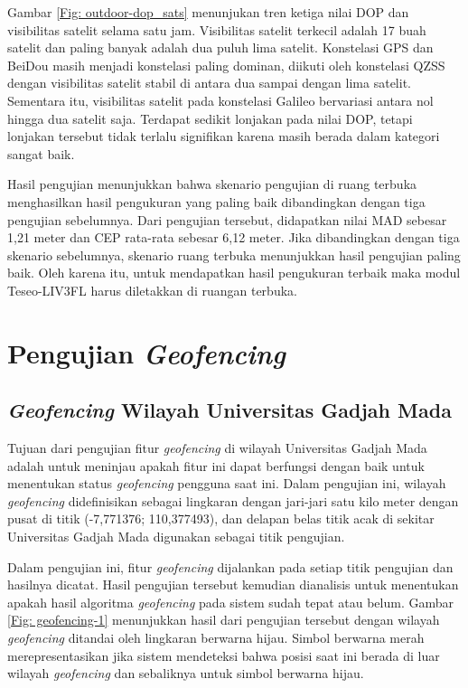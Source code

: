 Gambar \ref{Fig: outdoor-dop_sats} menunjukan tren ketiga nilai DOP dan visibilitas satelit selama satu jam. Visibilitas satelit terkecil adalah 17 buah satelit dan paling banyak adalah dua puluh lima satelit. Konstelasi GPS dan BeiDou masih menjadi konstelasi paling dominan, diikuti oleh konstelasi QZSS dengan visibilitas satelit stabil di antara dua sampai dengan lima satelit. Sementara itu, visibilitas satelit pada konstelasi Galileo bervariasi antara nol hingga dua satelit saja. Terdapat sedikit lonjakan pada nilai DOP, tetapi lonjakan tersebut tidak terlalu signifikan karena masih berada dalam kategori sangat baik.

Hasil pengujian menunjukkan bahwa skenario pengujian di ruang terbuka menghasilkan hasil pengukuran yang paling baik dibandingkan dengan tiga pengujian sebelumnya. Dari pengujian tersebut, didapatkan nilai MAD sebesar 1,21 meter dan CEP rata-rata sebesar 6,12 meter. Jika dibandingkan dengan tiga skenario sebelumnya, skenario ruang terbuka menunjukkan hasil pengujian paling baik. Oleh karena itu, untuk mendapatkan hasil pengukuran terbaik maka modul Teseo\hyp{}LIV3FL harus diletakkan di ruangan terbuka.

\section{Pengujian \textit{Geofencing}}
\subsection{\textit{Geofencing} Wilayah Universitas Gadjah Mada}
Tujuan dari pengujian fitur \textit{geofencing} di wilayah Universitas Gadjah Mada adalah untuk meninjau apakah fitur ini dapat berfungsi dengan baik untuk menentukan status \textit{geofencing} pengguna saat ini. Dalam pengujian ini, wilayah \textit{geofencing} didefinisikan sebagai lingkaran dengan jari-jari satu kilo meter dengan pusat di titik (-7,771376; 110,377493), dan delapan belas titik acak di sekitar Universitas Gadjah Mada digunakan sebagai titik pengujian.

Dalam pengujian ini, fitur \textit{geofencing} dijalankan pada setiap titik pengujian dan hasilnya dicatat. Hasil pengujian tersebut kemudian dianalisis untuk menentukan apakah hasil algoritma \textit{geofencing} pada sistem sudah tepat atau belum. Gambar \ref{Fig: geofencing-1} menunjukkan hasil dari pengujian tersebut dengan wilayah \textit{geofencing} ditandai oleh lingkaran berwarna hijau. Simbol berwarna merah merepresentasikan jika sistem mendeteksi bahwa posisi saat ini berada di luar wilayah \textit{geofencing} dan sebaliknya untuk simbol berwarna hijau.

